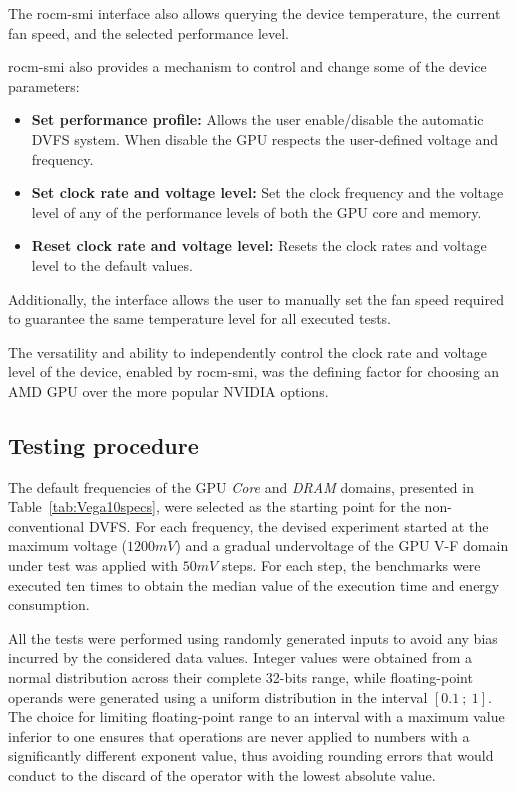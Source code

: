 The rocm-smi interface also allows querying the device temperature, the current fan speed, and the selected performance level.

rocm-smi also provides a mechanism to control and change some of the device parameters:
\begin{itemize}
\item \textbf{Set performance profile:} Allows the user enable/disable the automatic DVFS system. When disable the GPU respects the user-defined voltage and frequency.
\item \textbf{Set clock rate and voltage level:} Set the clock frequency and the voltage level of any of the performance levels of both the GPU core and memory. 
\item \textbf{Reset clock rate and voltage level:} Resets the clock rates and voltage level to the default values.
\end{itemize}

Additionally, the interface allows the user to manually set the fan speed required to guarantee the same temperature level for all executed tests.

The versatility and ability to independently control the clock rate and voltage level of the device, enabled by rocm-smi, was the defining factor for choosing an AMD GPU over the more popular NVIDIA options.


\subsection{Testing procedure}
\label{sec:ex_setup}

The default frequencies of the GPU \textit{Core} and \textit{DRAM} domains, presented in Table~\ref{tab:Vega10specs}, were selected as the starting point for the non-conventional DVFS. For each frequency, the devised experiment started at the maximum voltage ($1200mV$) and a gradual undervoltage of the GPU V-F domain under test was applied with $50mV$ steps. For each step, the benchmarks were executed ten times to obtain the median value of the execution time and energy consumption. 

All the tests were performed using randomly generated inputs to avoid any bias incurred by the considered data values. Integer values were obtained from a normal distribution across their complete 32-bits range, while floating-point operands were generated using a uniform distribution in the interval $[0.1~;~1]$. The choice for limiting floating-point range to an interval with a maximum value inferior to one ensures that operations are never applied to numbers with a significantly different exponent value, thus avoiding rounding errors that would conduct to the discard of the operator with the lowest absolute value.

